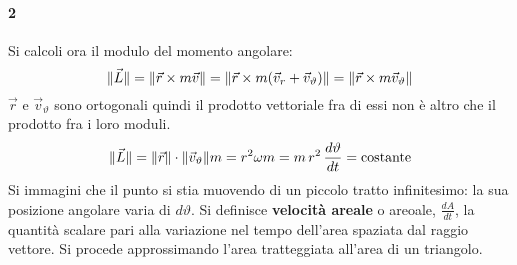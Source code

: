 \documentclass[10pt,a4paper]{book}
\DeclarePairedDelimiter{\norma}{\lVert}{\rVert} %
\begin{document}
\paragraph{2} Si calcoli ora il modulo del momento angolare:
\[
	\norma{\vec{L}}=\norma{\vec{r}\times m\vec{v}}=\norma{\vec{r}\times m(\vec{v}_r+\vec{v}_\vartheta)}=\norma{\vec{r}\times m \vec{v}_\vartheta}
\]
$\vec{r}$ e $\vec{v}_\vartheta$ sono ortogonali quindi il prodotto vettoriale fra di essi non è altro che il prodotto fra i loro moduli.
\[
	\norma{\vec{L}}=\norma{\vec{r}} \cdot \norma{\vec{v}_\vartheta} m=r^2\omega m=m\,r^2\,\frac{d\vartheta}{dt}=\text{costante}
\]
Si immagini che il punto si stia muovendo di un piccolo tratto infinitesimo:  la sua posizione angolare varia di $d\vartheta$. Si definisce \textbf{velocità areale} o areoale, $\frac{dA}{dt}$, la quantità scalare pari alla variazione nel tempo dell'area spaziata dal raggio vettore. Si procede approssimando l'area tratteggiata all'area di un triangolo.
\end{document}

